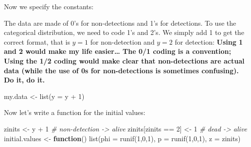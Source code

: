 \documentclass[
  12pt,
]{krantz}
\newenvironment{Shaded}{\begin{snugshade}}{\end{snugshade}}
\newcommand{\AttributeTok}[1]{\textcolor[rgb]{0.77,0.63,0.00}{#1}}
\newcommand{\CommentTok}[1]{\textcolor[rgb]{0.56,0.35,0.01}{\textit{#1}}}
\newcommand{\ControlFlowTok}[1]{\textcolor[rgb]{0.13,0.29,0.53}{\textbf{#1}}}
\newcommand{\DecValTok}[1]{\textcolor[rgb]{0.00,0.00,0.81}{#1}}
\newcommand{\DocumentationTok}[1]{\textcolor[rgb]{0.56,0.35,0.01}{\textbf{\textit{#1}}}}
\newcommand{\FunctionTok}[1]{\textcolor[rgb]{0.00,0.00,0.00}{#1}}
\newcommand{\NormalTok}[1]{#1}
\newcommand{\OtherTok}[1]{\textcolor[rgb]{0.56,0.35,0.01}{#1}}
\newcommand{\SpecialCharTok}[1]{\textcolor[rgb]{0.00,0.00,0.00}{#1}}
\begin{document}
Now we specify the constants:

\begin{Shaded}
\end{Shaded}

The data are made of 0's for non-detections and 1's for detections. To use the categorical distribution, we need to code 1's and 2's. We simply add 1 to get the correct format, that is \(y = 1\) for non-detection and \(y = 2\) for detection: \textbf{Using 1 and 2 would make my life easier\ldots{} The 0/1 coding is a convention; Using the 1/2 coding would make clear that non-detections are actual data (while the use of 0s for non-detections is sometimes confusing). Do it, do it.}

\begin{Shaded}
\begin{Highlighting}[]
\NormalTok{my.data }\OtherTok{\textless{}{-}} \FunctionTok{list}\NormalTok{(}\AttributeTok{y =}\NormalTok{ y }\SpecialCharTok{+} \DecValTok{1}\NormalTok{)}
\end{Highlighting}
\end{Shaded}

Now let's write a function for the initial values:

\begin{Shaded}
\begin{Highlighting}[]
\NormalTok{zinits }\OtherTok{\textless{}{-}}\NormalTok{ y }\SpecialCharTok{+} \DecValTok{1} \CommentTok{\# non{-}detection {-}\textgreater{} alive}
\NormalTok{zinits[zinits }\SpecialCharTok{==} \DecValTok{2}\NormalTok{] }\OtherTok{\textless{}{-}} \DecValTok{1} \CommentTok{\# dead {-}\textgreater{} alive}
\NormalTok{initial.values }\OtherTok{\textless{}{-}} \ControlFlowTok{function}\NormalTok{() }\FunctionTok{list}\NormalTok{(}\AttributeTok{phi =} \FunctionTok{runif}\NormalTok{(}\DecValTok{1}\NormalTok{,}\DecValTok{0}\NormalTok{,}\DecValTok{1}\NormalTok{),}
                                  \AttributeTok{p =} \FunctionTok{runif}\NormalTok{(}\DecValTok{1}\NormalTok{,}\DecValTok{0}\NormalTok{,}\DecValTok{1}\NormalTok{),}
                                  \AttributeTok{z =}\NormalTok{ zinits)}
\end{Highlighting}
\end{Shaded}
\end{document}
